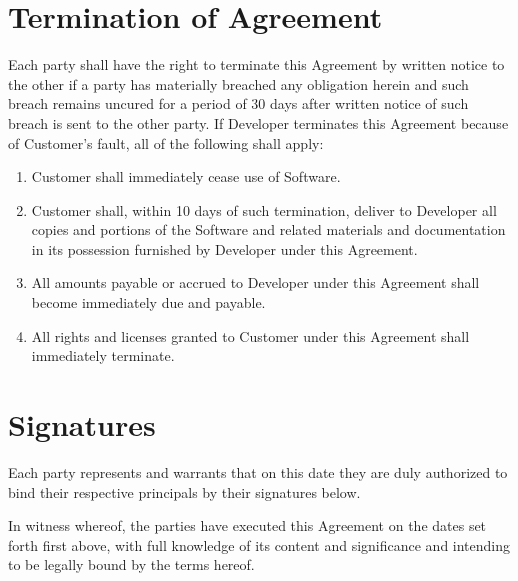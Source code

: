 \documentclass[11pt]{article}
\begin{document}
\section{Termination of Agreement}
\label{sec:termination}
Each party shall have the right to terminate this Agreement by written notice to the other if a party has materially breached any obligation herein and such breach remains uncured for a period of 30 days after written notice of such breach is sent to the other party.
If Developer terminates this Agreement because of Customer's fault, all of the following shall apply:
\begin{enumerate} \itemsep0pt \parskip0pt 
\renewcommand{\labelenumi}{(\Alph{enumi})}
\item Customer shall immediately cease use of Software. 
\item Customer shall, within 10 days of such termination, deliver to Developer all copies and portions of the Software and related materials and documentation in its possession furnished by Developer under this Agreement. 
\item All amounts payable or accrued to Developer under this Agreement shall become immediately due and payable. 
\item All rights and licenses granted to Customer under this Agreement shall immediately terminate. 
\end{enumerate}
\section{Signatures}
Each party represents and warrants that on this date they are duly authorized to bind their respective principals by their signatures below.

In witness whereof, the parties have executed this Agreement on the dates set forth first above, with full knowledge of its content and significance and intending to be legally bound by the terms hereof.

\setlength{\parskip}{20pt} %
\par\noindent{}      \hfill{}%
\setlength{\parskip}{15pt} %
\par\noindent\makebox[2.5in]{\hrulefill} \hfill\makebox[2.5in]{\hrulefill}%
\setlength{\parskip}{0pt} %
\par\noindent{}      \hfill{}%
\setlength{\parskip}{15pt} %
\par\noindent\makebox[2.5in]{\hrulefill} \hfill\makebox[2.5in]{\hrulefill}%
\setlength{\parskip}{0pt} %
\par\noindent{}      \hfill{}%
\end{document}
